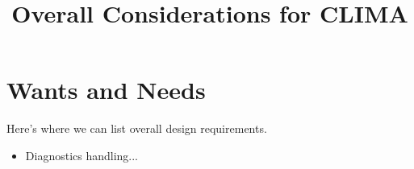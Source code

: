 \documentclass{article}
\title{Overall Considerations for CLIMA}
\begin{document}
\maketitle

\section{Wants and Needs}

Here's where we can list overall design requirements.
\begin{itemize}
    \item Diagnostics handling...
\end{itemize}
\end{document}
